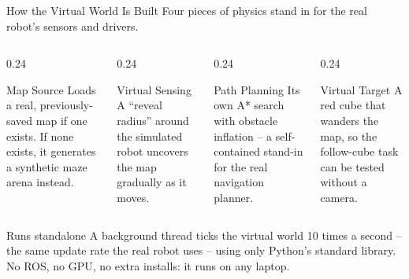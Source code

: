 \documentclass[aspectratio=169, 11pt]{beamer}
\begin{document}
\begin{frame}{How the Virtual World Is Built}
  \footnotesize
  Four pieces of physics stand in for the real robot's sensors and drivers.
  \begin{columns}[T]
    \begin{column}{0.24\textwidth}
      \begin{block}{Map Source}
        \tiny Loads a real, previously-saved map if one exists. If none exists, it generates a synthetic maze arena instead.
      \end{block}
    \end{column}
    \begin{column}{0.24\textwidth}
      \begin{block}{Virtual Sensing}
        \tiny A ``reveal radius'' around the simulated robot uncovers the map gradually as it moves.
      \end{block}
    \end{column}
    \begin{column}{0.24\textwidth}
      \begin{block}{Path Planning}
        \tiny Its own A* search with obstacle inflation -- a self-contained stand-in for the real navigation planner.
      \end{block}
    \end{column}
    \begin{column}{0.24\textwidth}
      \begin{block}{Virtual Target}
        \tiny A red cube that wanders the map, so the follow-cube task can be tested without a camera.
      \end{block}
    \end{column}
  \end{columns}
  \vspace{0.3cm}
  \begin{block}{Runs standalone}
    \footnotesize
    A background thread ticks the virtual world 10 times a second -- the same update rate the real robot uses -- using only Python's standard library. No ROS, no GPU, no extra installs: it runs on any laptop.
  \end{block}
\end{frame}
\end{document}

